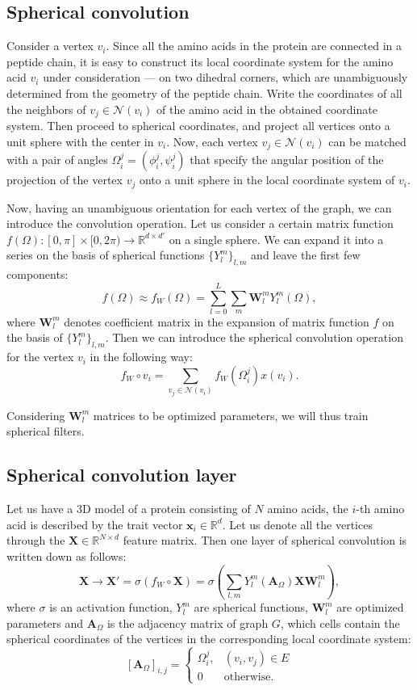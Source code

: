 \documentclass[12pt,twoside]{article}
\begin{document}
	\subsection{Spherical convolution}
	Consider a vertex $v_i$. Since all the amino acids in the protein are connected in a peptide chain, it is easy to
	construct its local coordinate system for the amino acid $v_i$ under consideration — on two dihedral corners,
	which are unambiguously determined from the geometry of the peptide chain. Write the coordinates of all the neighbors of $v_j \in \mathcal{N}(v_i)$
	of the amino acid in the obtained coordinate system. Then proceed to spherical coordinates, and project all vertices onto a unit sphere
	with the center in $v_i$. Now, each vertex $v_j \in \mathcal{N}(v_i)$ can be matched with a pair of angles $\Omega_i^j = (\phi_i^j, \psi_i^j)$ that specify the
	angular position of the projection of the vertex $v_j$ onto a unit sphere in the local coordinate system of $v_i$.

	Now, having an unambiguous orientation for each vertex of the graph, we can introduce the convolution operation. Let us consider a certain 
	matrix function $f(\Omega) : [0, \pi] \times [0, 2\pi) \rightarrow \mathbb{R}^{d \times d'} $ on a single sphere. We can expand it
	into a series on the basis of spherical functions $\{Y_l^m\}_{l,m}$ and leave the first few components:
	$$
		f(\Omega) \approx f_W(\Omega) = \sum_{l=0}^{L}\sum_m \boldsymbol{W}_l^m Y_l^m(\Omega),
	$$
	where $\boldsymbol{W}_l^m$ denotes coefficient matrix in the expansion of matrix function $f$ on the basis of $\{Y_l^m\}_{l,m}$. Then
	we can introduce the spherical convolution operation for the vertex $v_i$ in the following way:
	$$f_W \circ v_i = \sum_{v_j \in \mathcal{N}(v_i)} f_W(\Omega_i^j)x(v_i).$$

	Considering $\boldsymbol{W}_l^m$ matrices to be optimized parameters, we will thus train spherical filters.

	\subsection{Spherical convolution layer}
	Let us have a 3D model of a protein consisting of $N$ amino acids, the $i$-th amino acid is described by the trait vector $\boldsymbol{x}_i \in \mathbb{R}^d$.
	Let us denote all the vertices through the $\boldsymbol{X} \in \mathbb{R}^{N \times d}$ feature matrix. Then one layer of spherical
	convolution is written down as follows:
	$$
		\boldsymbol{X} \longrightarrow \boldsymbol{X}' = \sigma(f_W \circ \boldsymbol{X}) = \sigma\left(\sum_{l,m}Y_l^m(\boldsymbol{A}_\Omega)\boldsymbol{X}\boldsymbol{W}_l^m\right),
	$$
	where $\sigma$ is an activation function, $Y_l^m$ are spherical functions, $\boldsymbol{W}_l^m$ are optimized parameters and $\boldsymbol{A}_\Omega$
	is the adjacency matrix of graph $G$, which cells contain the spherical coordinates of the vertices in the corresponding local coordinate system:
	$$
		[\boldsymbol{A}_\Omega]_{i,j} = \begin{cases}
			\Omega_i^j, & (v_i, v_j) \in E \\
			0 & \text{otherwise}.
		\end{cases}
	$$
\end{document}
